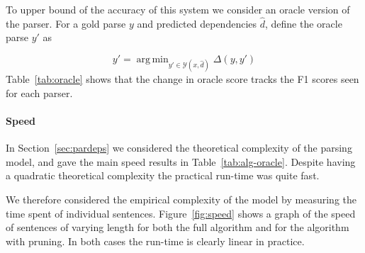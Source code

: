\documentclass[11pt,letterpaper]{article}
\DeclareMathOperator*{\argmin}{arg\,min}
\begin{document}
To upper bound of the accuracy of this system we consider an
oracle version of the parser. For a gold parse $y$ and predicted
dependencies $\hat{d}$, define the oracle parse $y'$ as

\[ y' = \argmin_{y' \in \mathcal{Y}(x, \hat{d})} \Delta(y, y') \]
Table~\ref{tab:oracle} shows that the change in oracle score tracks the 
F1 scores seen for each parser.


\paragraph{Speed}

In Section~\ref{sec:pardeps} we considered the theoretical 
complexity of the parsing model, and gave the main 
speed results in Table~\ref{tab:alg-oracle}.
Despite having a quadratic theoretical complexity
the practical run-time was quite fast.

We therefore considered the empirical complexity of the 
model by measuring the time spent of individual sentences. 
Figure~\ref{fig:speed} shows a graph of the speed of
sentences of varying length for both the full algorithm
and for the algorithm with pruning. In both 
cases the run-time is clearly linear in practice.






\end{document}
